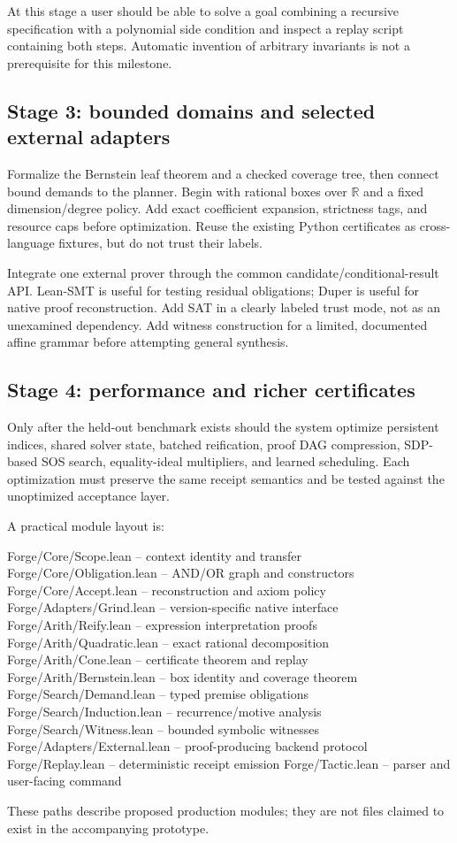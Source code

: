 \documentclass[11pt,letterpaper]{article}
\newcommand{\R}{\mathbb{R}}
\theoremstyle{definition}
\theoremstyle{remark}
\begin{document}
At this stage a user should be able to solve a goal combining a recursive specification with a polynomial side condition and inspect a replay script containing both steps. Automatic invention of arbitrary invariants is not a prerequisite for this milestone.

\subsection{Stage 3: bounded domains and selected external adapters}
Formalize the Bernstein leaf theorem and a checked coverage tree, then connect bound demands to the planner. Begin with rational boxes over $\R$ and a fixed dimension/degree policy. Add exact coefficient expansion, strictness tags, and resource caps before optimization. Reuse the existing Python certificates as cross-language fixtures, but do not trust their labels.

Integrate one external prover through the common candidate/conditional-result API. Lean-SMT is useful for testing residual obligations; Duper is useful for native proof reconstruction. Add SAT in a clearly labeled trust mode, not as an unexamined dependency. Add witness construction for a limited, documented affine grammar before attempting general synthesis.

\subsection{Stage 4: performance and richer certificates}
Only after the held-out benchmark exists should the system optimize persistent indices, shared solver state, batched reification, proof DAG compression, SDP-based SOS search, equality-ideal multipliers, and learned scheduling. Each optimization must preserve the same receipt semantics and be tested against the unoptimized acceptance layer.

A practical module layout is:
\begin{code}
Forge/Core/Scope.lean          -- context identity and transfer
Forge/Core/Obligation.lean     -- AND/OR graph and constructors
Forge/Core/Accept.lean         -- reconstruction and axiom policy
Forge/Adapters/Grind.lean      -- version-specific native interface
Forge/Arith/Reify.lean         -- expression interpretation proofs
Forge/Arith/Quadratic.lean     -- exact rational decomposition
Forge/Arith/Cone.lean          -- certificate theorem and replay
Forge/Arith/Bernstein.lean     -- box identity and coverage theorem
Forge/Search/Demand.lean       -- typed premise obligations
Forge/Search/Induction.lean    -- recurrence/motive analysis
Forge/Search/Witness.lean      -- bounded symbolic witnesses
Forge/Adapters/External.lean   -- proof-producing backend protocol
Forge/Replay.lean              -- deterministic receipt emission
Forge/Tactic.lean              -- parser and user-facing command
\end{code}
These paths describe proposed production modules; they are not files claimed to exist in the accompanying prototype.
\end{document}
